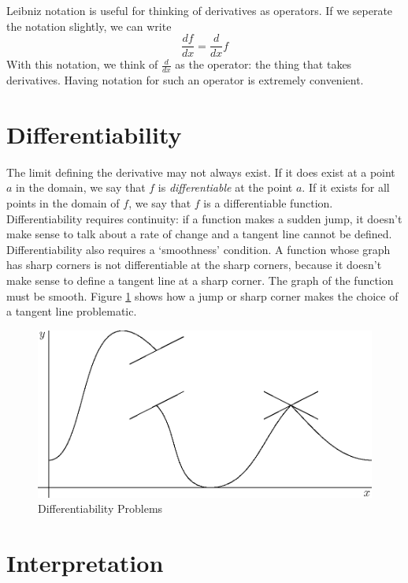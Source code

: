 \documentclass[fleqn]{report}
\begin{document}
Leibniz notation is useful for thinking of derivatives as
operators. If we seperate the notation slightly, we can write
\begin{equation*}
\frac{df}{dx} = \frac{d}{dx} f
\end{equation*}
With this notation, we think of $\frac{d}{dx}$ as the
operator: the thing that takes derivatives. Having notation
for such an operator is extremely convenient.

\section*{Differentiability}

The limit defining the derivative may not always exist. If it
does exist at a point $a$ in the domain, we say that $f$ is
\emph{differentiable} at the point $a$. If it exists for all points
in the domain of $f$, we say that $f$ is a differentiable
function. Differentiability requires continuity: if a
function makes a sudden jump, it doesn't make sense to talk
about a rate of change and a tangent line cannot be defined.
Differentiability also requires a `smoothness' condition. A
function whose graph has sharp corners is not differentiable
at the sharp corners, because it doesn't make sense to define
a tangent line at a sharp corner. The graph of the function
must be smooth. Figure \ref{Differentiability Problems}  shows
how a jump or sharp corner makes the choice of a tangent line
problematic.

\begin{figure}[t]
\centering
\includegraphics[width=12cm]{figure48.eps}
\caption{Differentiability Problems}
\label{Differentiability Problems}
\end{figure}

\section*{Interpretation}
\end{document}
